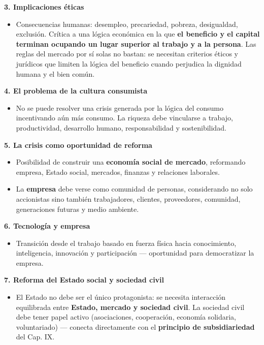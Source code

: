 \documentclass[10pt,a4paper]{article}
\begin{document}
\medskip\noindent \textbf{3. Implicaciones éticas}\par\nopagebreak
\begin{itemize}
\item Consecuencias humanas: desempleo, precariedad, pobreza, desigualdad, exclusión. Crítica a una lógica económica en la que \textbf{el beneficio y el capital terminan ocupando un lugar superior al trabajo y a la persona}. Las reglas del mercado por sí solas no bastan: se necesitan criterios éticos y jurídicos que limiten la lógica del beneficio cuando perjudica la dignidad humana y el bien común.
\end{itemize}

\medskip\noindent \textbf{4. El problema de la cultura consumista}\par\nopagebreak
\begin{itemize}
\item No se puede resolver una crisis generada por la lógica del consumo incentivando aún más consumo. La riqueza debe vincularse a trabajo, productividad, desarrollo humano, responsabilidad y sostenibilidad.
\end{itemize}

\medskip\noindent \textbf{5. La crisis como oportunidad de reforma}\par\nopagebreak
\begin{itemize}
\item Posibilidad de construir una \textbf{economía social de mercado}, reformando empresa, Estado social, mercados, finanzas y relaciones laborales.
\item La \textbf{empresa} debe verse como comunidad de personas, considerando no solo accionistas sino también trabajadores, clientes, proveedores, comunidad, generaciones futuras y medio ambiente.
\end{itemize}

\medskip\noindent \textbf{6. Tecnología y empresa}\par\nopagebreak
\begin{itemize}
\item Transición desde el trabajo basado en fuerza física hacia conocimiento, inteligencia, innovación y participación --- oportunidad para democratizar la empresa.
\end{itemize}

\medskip\noindent \textbf{7. Reforma del Estado social y sociedad civil}\par\nopagebreak
\begin{itemize}
\item El Estado no debe ser el único protagonista: se necesita interacción equilibrada entre \textbf{Estado, mercado y sociedad civil}. La sociedad civil debe tener papel activo (asociaciones, cooperación, economía solidaria, voluntariado) --- conecta directamente con el \textbf{principio de subsidiariedad} del Cap. IX.
\end{itemize}
\end{document}
